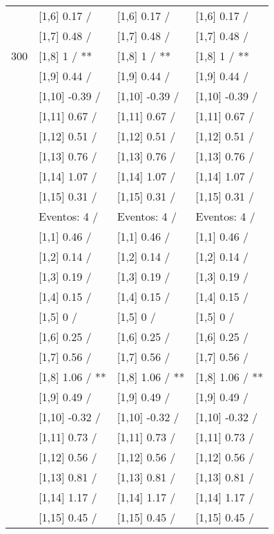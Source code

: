 \begin{table}
\begin{tabular}[t]{llll}
 & {}[1,6] 0.17  / & {}[1,6] 0.17  / & {}[1,6] 0.17  /\\
 & {}[1,7] 0.48  / & {}[1,7] 0.48  / & {}[1,7] 0.48  /\\
300 & {}[1,8] 1  / ** & {}[1,8] 1  / ** & {}[1,8] 1  / **\\
\addlinespace
 & {}[1,9] 0.44  / & {}[1,9] 0.44  / & {}[1,9] 0.44  /\\
 & {}[1,10] -0.39  / & {}[1,10] -0.39  / & {}[1,10] -0.39  /\\
 & {}[1,11] 0.67  / & {}[1,11] 0.67  / & {}[1,11] 0.67  /\\
 & {}[1,12] 0.51  / & {}[1,12] 0.51  / & {}[1,12] 0.51  /\\
 & {}[1,13] 0.76  / & {}[1,13] 0.76  / & {}[1,13] 0.76  /\\
\addlinespace
 & {}[1,14] 1.07  / & {}[1,14] 1.07  / & {}[1,14] 1.07  /\\
 & {}[1,15] 0.31  / & {}[1,15] 0.31  / & {}[1,15] 0.31  /\\
 & Eventos:  4 / & Eventos:  4 / & Eventos:  4 /\\
 & {}[1,1] 0.46  / & {}[1,1] 0.46  / & {}[1,1] 0.46  /\\
 & {}[1,2] 0.14  / & {}[1,2] 0.14  / & {}[1,2] 0.14  /\\
\addlinespace
 & {}[1,3] 0.19  / & {}[1,3] 0.19  / & {}[1,3] 0.19  /\\
 & {}[1,4] 0.15  / & {}[1,4] 0.15  / & {}[1,4] 0.15  /\\
 & {}[1,5] 0  / & {}[1,5] 0  / & {}[1,5] 0  /\\
 & {}[1,6] 0.25  / & {}[1,6] 0.25  / & {}[1,6] 0.25  /\\
 & {}[1,7] 0.56  / & {}[1,7] 0.56  / & {}[1,7] 0.56  /\\
\addlinespace
500 & {}[1,8] 1.06  / ** & {}[1,8] 1.06  / ** & {}[1,8] 1.06  / **\\
 & {}[1,9] 0.49  / & {}[1,9] 0.49  / & {}[1,9] 0.49  /\\
 & {}[1,10] -0.32  / & {}[1,10] -0.32  / & {}[1,10] -0.32  /\\
 & {}[1,11] 0.73  / & {}[1,11] 0.73  / & {}[1,11] 0.73  /\\
 & {}[1,12] 0.56  / & {}[1,12] 0.56  / & {}[1,12] 0.56  /\\
\addlinespace
 & {}[1,13] 0.81  / & {}[1,13] 0.81  / & {}[1,13] 0.81  /\\
 & {}[1,14] 1.17  / & {}[1,14] 1.17  / & {}[1,14] 1.17  /\\
 & {}[1,15] 0.45  / & {}[1,15] 0.45  / & {}[1,15] 0.45  /\\
\bottomrule
\end{tabular}
\end{table}
